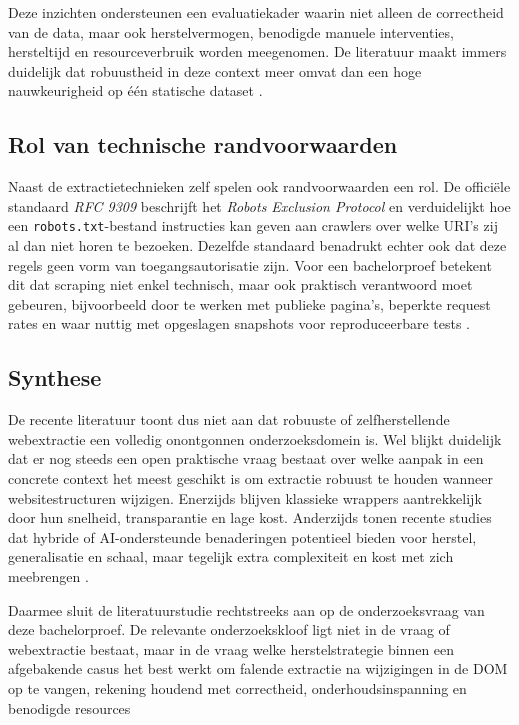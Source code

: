 Deze inzichten ondersteunen een evaluatiekader waarin niet alleen de correctheid van de data, maar ook herstelvermogen, benodigde manuele interventies, hersteltijd en resourceverbruik worden meegenomen. De literatuur maakt immers duidelijk dat robuustheid in deze context meer omvat dan een hoge nauwkeurigheid op één statische dataset \autocite{yang2026livewebie, kurkin2025nexteval, farag2025pinterest}.

\subsection{Rol van technische randvoorwaarden}
\label{subsec:lit-randvoorwaarden}

Naast de extractietechnieken zelf spelen ook randvoorwaarden een rol. De officiële standaard \textit{RFC 9309} beschrijft het \textit{Robots Exclusion Protocol} en verduidelijkt hoe een \texttt{robots.txt}-bestand instructies kan geven aan crawlers over welke URI's zij al dan niet horen te bezoeken. Dezelfde standaard benadrukt echter ook dat deze regels geen vorm van toegangsautorisatie zijn. Voor een bachelorproef betekent dit dat scraping niet enkel technisch, maar ook praktisch verantwoord moet gebeuren, bijvoorbeeld door te werken met publieke pagina’s, beperkte request rates en waar nuttig met opgeslagen snapshots voor reproduceerbare tests \autocite{rfc9309}.

\subsection{Synthese}
\label{subsec:lit-synthese}

De recente literatuur toont dus niet aan dat robuuste of zelfherstellende webextractie een volledig onontgonnen onderzoeksdomein is. Wel blijkt duidelijk dat er nog steeds een open praktische vraag bestaat over welke aanpak in een concrete context het meest geschikt is om extractie robuust te houden wanneer websitestructuren wijzigen. Enerzijds blijven klassieke wrappers aantrekkelijk door hun snelheid, transparantie en lage kost. Anderzijds tonen recente studies dat hybride of AI-ondersteunde benaderingen potentieel bieden voor herstel, generalisatie en schaal, maar tegelijk extra complexiteit en kost met zich meebrengen \autocite{marineli2025controlplanes, yang2026livewebie, bohra2025weblists, farag2025pinterest, kurkin2025nexteval}.

Daarmee sluit de literatuurstudie rechtstreeks aan op de onderzoeksvraag van deze bachelorproef. De relevante onderzoekskloof ligt niet in de vraag of webextractie bestaat, maar in de vraag welke herstelstrategie binnen een afgebakende casus het best werkt om falende extractie na wijzigingen in de DOM op te vangen, rekening houdend met correctheid, onderhoudsinspanning en benodigde resources \autocite{marineli2025controlplanes, yang2026livewebie, farag2025pinterest, kurkin2025nexteval}
